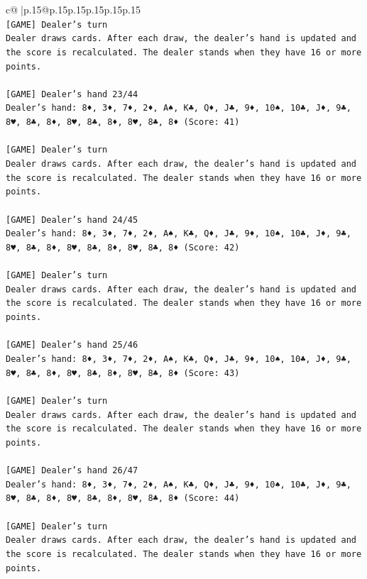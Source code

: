 \documentclass{article}
\begin{document}
{\begin{supertabular}{c@{$\;$}|p{.15\linewidth}@{}p{.15\linewidth}p{.15\linewidth}p{.15\linewidth}p{.15\linewidth}p{.15\linewidth}}
{{{\\ 
\texttt{{[}GAME{]} Dealer's turn} \\
\texttt{Dealer draws cards. After each draw, the dealer's hand is updated and the score is recalculated. The dealer stands when they have 16 or more points.} \\
\\ 
\texttt{{[}GAME{]} Dealer's hand 23/44} \\
\texttt{Dealer's hand: 8♦, 3♦, 7♦, 2♦, A♠, K♣, Q♦, J♣, 9♦, 10♠, 10♣, J♦, 9♣, 8♥, 8♣, 8♦, 8♥, 8♣, 8♦, 8♥, 8♣, 8♦ (Score: 41)} \\
\\ 
\texttt{{[}GAME{]} Dealer's turn} \\
\texttt{Dealer draws cards. After each draw, the dealer's hand is updated and the score is recalculated. The dealer stands when they have 16 or more points.} \\
\\ 
\texttt{{[}GAME{]} Dealer's hand 24/45} \\
\texttt{Dealer's hand: 8♦, 3♦, 7♦, 2♦, A♠, K♣, Q♦, J♣, 9♦, 10♠, 10♣, J♦, 9♣, 8♥, 8♣, 8♦, 8♥, 8♣, 8♦, 8♥, 8♣, 8♦ (Score: 42)} \\
\\ 
\texttt{{[}GAME{]} Dealer's turn} \\
\texttt{Dealer draws cards. After each draw, the dealer's hand is updated and the score is recalculated. The dealer stands when they have 16 or more points.} \\
\\ 
\texttt{{[}GAME{]} Dealer's hand 25/46} \\
\texttt{Dealer's hand: 8♦, 3♦, 7♦, 2♦, A♠, K♣, Q♦, J♣, 9♦, 10♠, 10♣, J♦, 9♣, 8♥, 8♣, 8♦, 8♥, 8♣, 8♦, 8♥, 8♣, 8♦ (Score: 43)} \\
\\ 
\texttt{{[}GAME{]} Dealer's turn} \\
\texttt{Dealer draws cards. After each draw, the dealer's hand is updated and the score is recalculated. The dealer stands when they have 16 or more points.} \\
\\ 
\texttt{{[}GAME{]} Dealer's hand 26/47} \\
\texttt{Dealer's hand: 8♦, 3♦, 7♦, 2♦, A♠, K♣, Q♦, J♣, 9♦, 10♠, 10♣, J♦, 9♣, 8♥, 8♣, 8♦, 8♥, 8♣, 8♦, 8♥, 8♣, 8♦ (Score: 44)} \\
\\ 
\texttt{{[}GAME{]} Dealer's turn} \\
\texttt{Dealer draws cards. After each draw, the dealer's hand is updated and the score is recalculated. The dealer stands when they have 16 or more points.} \\
}}}
\end{supertabular}}
\end{document}
